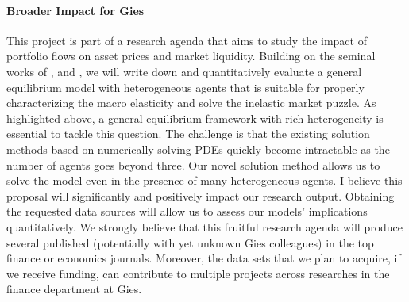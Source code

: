 \paragraph{Broader Impact for Gies}\label{sec:impact} 
This project is part of a research agenda that aims to study the impact of portfolio flows on asset prices and market liquidity. Building on the seminal works of \cite{Koijen/Yogo/19}, and \cite{gabaix2020search}, we will write down and quantitatively evaluate a general equilibrium model with heterogeneous agents that is suitable for properly characterizing the macro elasticity and solve the inelastic market puzzle. As highlighted above, a general equilibrium framework with rich heterogeneity is essential to tackle this question. The challenge is that the existing solution methods based on numerically solving PDEs quickly become intractable as the number of agents goes beyond three. Our novel solution method allows us to solve the model even in the presence of many heterogeneous agents. 
I believe this proposal will significantly and positively impact our research output. Obtaining the requested data sources will allow us to assess our models' implications quantitatively. We strongly believe that this fruitful research agenda will produce several published (potentially with yet unknown Gies colleagues) in the top finance or economics journals. Moreover, the data sets that we plan to acquire, if we receive funding, can contribute to multiple projects across researches in the finance department at Gies.












\newpage
\singlespacing
%
\clearpage

